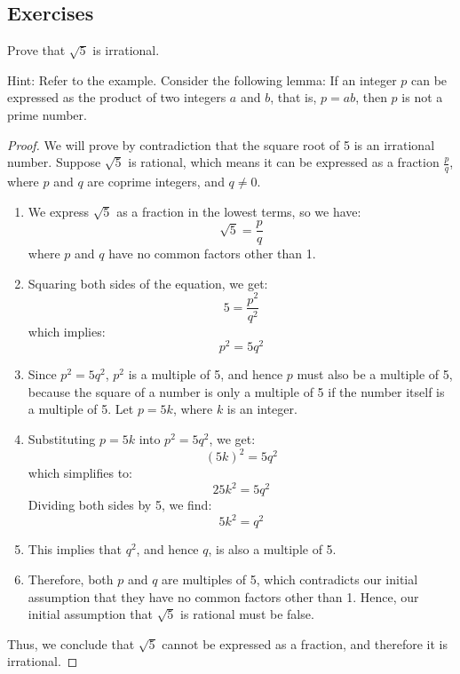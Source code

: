 \documentclass[
	12pt, %
	fleqn, %
	a4paper, %
]{LegrandOrangeBook}
\begin{document}
\subsection*{Exercises}
\begin{exercise}
    Prove that $\sqrt{5}$ is irrational.
\end{exercise}
Hint: Refer to the example. Consider the following lemma:
\noindent If an integer $p$ can be expressed as the product of two integers $a$ and $b$, that is, $p = ab$, then $p$ is not a prime number.
\begin{proof}
    We will prove by contradiction that the square root of 5 is an irrational number. Suppose $\sqrt{5}$ is rational, which means it can be expressed as a fraction $\frac{p}{q}$, where $p$ and $q$ are coprime integers, and $q \neq 0$. 

\begin{enumerate}
    \item We express $\sqrt{5}$ as a fraction in the lowest terms, so we have:
    \[
    \sqrt{5} = \frac{p}{q}
    \]
    where $p$ and $q$ have no common factors other than 1.

    \item Squaring both sides of the equation, we get:
    \[
    5 = \frac{p^2}{q^2}
    \]
    which implies:
    \[
    p^2 = 5q^2
    \]
    
    \item Since $p^2 = 5q^2$, $p^2$ is a multiple of 5, and hence $p$ must also be a multiple of 5, because the square of a number is only a multiple of 5 if the number itself is a multiple of 5. Let $p = 5k$, where $k$ is an integer.
    
    \item Substituting $p = 5k$ into $p^2 = 5q^2$, we get:
    \[
    (5k)^2 = 5q^2
    \]
    which simplifies to:
    \[
    25k^2 = 5q^2
    \]
    Dividing both sides by 5, we find:
    \[
    5k^2 = q^2
    \]
    
    \item This implies that $q^2$, and hence $q$, is also a multiple of 5.
    
    \item Therefore, both $p$ and $q$ are multiples of 5, which contradicts our initial assumption that they have no common factors other than 1. Hence, our initial assumption that $\sqrt{5}$ is rational must be false.
\end{enumerate}

Thus, we conclude that $\sqrt{5}$ cannot be expressed as a fraction, and therefore it is irrational.
\end{proof}
\end{document}
